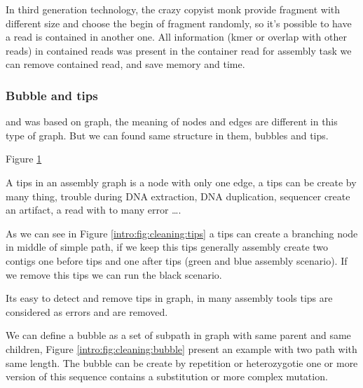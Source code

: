 \documentclass[./main.tex]{subfiles}
\begin{document}
In third generation technology, the crazy copyist monk provide fragment with different size and choose the begin of fragment randomly, so it's possible to have a read is contained in another one. All information (kmer or overlap with other reads) in contained reads was present in the container read for assembly task we can remove contained read, and save memory and time.

\subsubsection{Bubble and tips}

\OLC and \DBG was based on graph, the meaning of nodes and edges are different in this type of graph. But we can found same structure in them, bubbles and tips.

Figure \ref{intro:fig:cleaning}

\begin{figure}[ht]
    \caption{}
    \label{intro:fig:cleaning}
\end{figure}

A tips in an assembly graph is a node with only one edge, a tips can be create by many thing, trouble during DNA extraction, DNA duplication, sequencer create an artifact, a read with to many error ….

As we can see in Figure \ref{intro:fig:cleaning:tips} a tips can create a branching node in middle of simple path, if we keep this tips generally assembly create two contigs one before tips and one after tips (green and blue assembly scenario). If we remove this tips we can run the black scenario.

Its easy to detect and remove tips in graph, in many assembly tools tips are considered as errors and are removed.

We can define a bubble as a set of subpath in graph with same parent and same children, Figure \ref{intro:fig:cleaning:bubble} present an example with two path with same length. The bubble can be create by repetition or heterozygotie one or more version of this sequence contains a substitution or more complex mutation.
\end{document}
